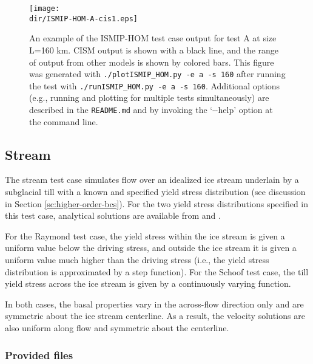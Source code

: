 \begin{figure}[H]
	\centering
	\texttt{[image: \\dir/ISMIP-HOM-A-cis1.eps]}
	\caption{An example of the ISMIP-HOM test case output for test A at size L=160 km. 
CISM output is shown with a black line, and the range of output from other models is shown by colored bars. 
This figure was generated with \texttt{./plotISMIP\_HOM.py -e a -s 160} after running the test with \texttt{./runISMIP\_HOM.py -e a -s 160}.
Additional options (e.g., running and plotting for multiple tests simultaneously) are described in the \texttt{README.md} and by invoking the
`-{}-help' option at the command line.}
	\label{fig:ismiphom-results}
\end{figure}
\FloatBarrier

\subsection{Stream}
\label{sc:stream_test}
The stream test case simulates flow over an idealized ice stream underlain by a subglacial till with a known and specified
yield stress distribution (see discussion in Section \ref{sc:higher-order-bcs}). For the two yield stress distributions specified in this test case, 
analytical solutions are available from \citet{Raymond2000} and \citet{Schoof2006}. 

For the Raymond test case, the yield stress within the ice stream is given a uniform value below the driving stress, and outside the
ice stream it is given a uniform value much higher than the driving stress (i.e., the yield stress distribution is approximated by a
step function). For the Schoof test case, the till yield stress across the ice stream is given by a continuously varying function.

In both cases, the basal properties vary in the across-flow direction only and are symmetric about the ice stream centerline.
As a result, the velocity solutions are also uniform along flow and symmetric about the centerline.

\subsubsection{Provided files}

